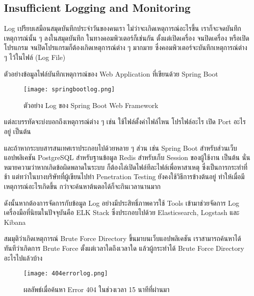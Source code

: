 \subsection{Insufficient Logging and Monitoring}

Log เปรียบเสมือนสมุดบันทึกประจำวันของคนเรา ไม่ว่าจะเกิดเหตุการณ์อะไรขึ้น เราก็จะจดบันทึกเหตุการณ์นั้น ๆ ลงในสมุดบันทึก ในทางคอมพิวเตอร์ก็เช่นกัน ตั้งแต่เปิดเครื่อง จนปิดเครื่อง หรือเปิดโปรแกรม จนปิดโปรแกรมก็ต้องเกิดเหตุการณ์ต่าง ๆ มากมาย ซึ่งคอมพิวเตอร์จะบันทึกเหตุการณ์ต่าง ๆ ไว้ในไฟล์ (Log File)

ตัวอย่างข้อมูลไฟล์บันทึกเหตุการณ์ของ Web Application ที่เขียนด้วย Spring Boot

\begin{figure}[h]
	\centering
	\texttt{[image: springbootlog.png]}
	\caption{ตัวอย่าง Log ของ Spring Boot Web Framework}
	\label{Fig:springbootlog.png}
\end{figure}

แต่ละบรรทัดจะบ่งบอกถึงเหตุการณ์ต่าง ๆ เช่น ใช้ไฟล์ตั้งค่าไฟล์ไหน โปรไฟล์อะไร เปิด Port อะไรอยู่ เป็นต้น

และถ้าหากระบบสารสนเทศเราประกอบไปด้วยหลาย ๆ ส่วน เช่น Spring Boot สำหรับส่วนเว็บแอปพลิเคชัน PostgreSQL สำหรับฐานข้อมูล Redis สำหรับเก็บ Session ของผู้ใช้งาน เป็นต้น นั่นหมายความว่าหากเกิดข้อผิดพลาดในระบบ ก็ต้องไล่เปิดไฟล์ทีละไฟล์เพื่อหาสาเหตุ ซึ่งเป็นการกระทำที่ช้า แต่ทว่าในบางบริษัทที่ผู้เขียนไปทำ Penetration Testing ยังคงใช้วิธีการข้างต้นอยู่ ทำให้เมื่อมีเหตุการณ์อะไรเกิดขึ้น กว่าจะค้นหาต้นตอได้ก็จะกินเวลานานมาก

ดังนั้นหากต้องการจัดการกับข้อมูล Log อย่างมีประสิทธิ์ภาพควรใช้ Tools เข้ามาช่วยจัดการ Log เครื่องมือที่นิยมในปัจจุบันคือ ELK Stack ซึ่งประกอบไปด้วย Elasticsearch\cite{}, Logstash\cite{} และ Kibana\cite{}

สมมุติว่าเกิดเหตุการณ์ Brute Force Directory ขึ้นมาบนเว็บแอปพลิเคชัน เราสามารถค้นหาได้ทันทีว่าเกิดการ Brute Force ตั้งแต่เวลาใดถึงเวลาใด แล้วผู้กระทำได้ Brute Force Directory อะไรไปแล้วบ้าง

\begin{figure}[h!]
	\centering
	\texttt{[image: 404errorlog.png]}
	\caption{ผลลัพธ์เมื่อค้นหา Error 404 ในช่วงเวลา 15 นาทีที่ผ่านมา}
	\label{Fig:404errorlog.png}
\end{figure}
